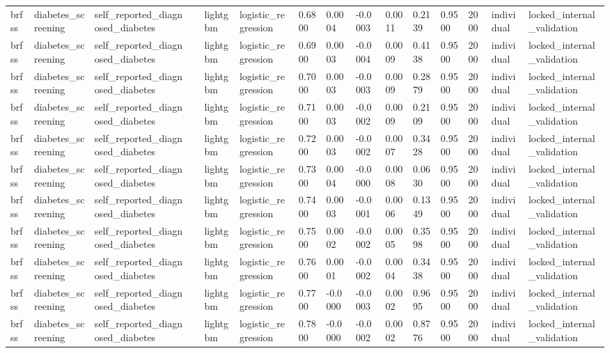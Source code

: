 \begin{tabular}{lllllllllllllll}
brfss & diabetes\_screening & self\_reported\_diagnosed\_diabetes &  & lightgbm & logistic\_regression & 0.6800 & 0.0004 & -0.0003 & 0.0011 & 0.2139 & 0.9500 & 2000 & individual & locked\_internal\_validation \\
brfss & diabetes\_screening & self\_reported\_diagnosed\_diabetes &  & lightgbm & logistic\_regression & 0.6900 & 0.0003 & -0.0004 & 0.0009 & 0.4138 & 0.9500 & 2000 & individual & locked\_internal\_validation \\
brfss & diabetes\_screening & self\_reported\_diagnosed\_diabetes &  & lightgbm & logistic\_regression & 0.7000 & 0.0003 & -0.0003 & 0.0009 & 0.2879 & 0.9500 & 2000 & individual & locked\_internal\_validation \\
brfss & diabetes\_screening & self\_reported\_diagnosed\_diabetes &  & lightgbm & logistic\_regression & 0.7100 & 0.0003 & -0.0002 & 0.0009 & 0.2109 & 0.9500 & 2000 & individual & locked\_internal\_validation \\
brfss & diabetes\_screening & self\_reported\_diagnosed\_diabetes &  & lightgbm & logistic\_regression & 0.7200 & 0.0003 & -0.0002 & 0.0007 & 0.3428 & 0.9500 & 2000 & individual & locked\_internal\_validation \\
brfss & diabetes\_screening & self\_reported\_diagnosed\_diabetes &  & lightgbm & logistic\_regression & 0.7300 & 0.0004 & -0.0000 & 0.0008 & 0.0630 & 0.9500 & 2000 & individual & locked\_internal\_validation \\
brfss & diabetes\_screening & self\_reported\_diagnosed\_diabetes &  & lightgbm & logistic\_regression & 0.7400 & 0.0003 & -0.0001 & 0.0006 & 0.1349 & 0.9500 & 2000 & individual & locked\_internal\_validation \\
brfss & diabetes\_screening & self\_reported\_diagnosed\_diabetes &  & lightgbm & logistic\_regression & 0.7500 & 0.0002 & -0.0002 & 0.0005 & 0.3598 & 0.9500 & 2000 & individual & locked\_internal\_validation \\
brfss & diabetes\_screening & self\_reported\_diagnosed\_diabetes &  & lightgbm & logistic\_regression & 0.7600 & 0.0001 & -0.0002 & 0.0004 & 0.3438 & 0.9500 & 2000 & individual & locked\_internal\_validation \\
brfss & diabetes\_screening & self\_reported\_diagnosed\_diabetes &  & lightgbm & logistic\_regression & 0.7700 & -0.0000 & -0.0003 & 0.0002 & 0.9695 & 0.9500 & 2000 & individual & locked\_internal\_validation \\
brfss & diabetes\_screening & self\_reported\_diagnosed\_diabetes &  & lightgbm & logistic\_regression & 0.7800 & -0.0000 & -0.0002 & 0.0002 & 0.8776 & 0.9500 & 2000 & individual & locked\_internal\_validation \\

\end{tabular}
